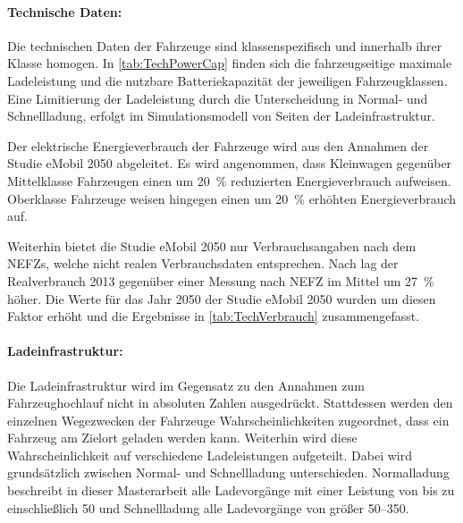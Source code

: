 

\paragraph{Technische Daten:}

Die technischen Daten der Fahrzeuge sind klassenspezifisch und innerhalb ihrer Klasse homogen.
In \autoref{tab:TechPowerCap} finden sich die fahrzeugseitige maximale Ladeleistung und die nutzbare Batteriekapazität der jeweiligen Fahrzeugklassen.
Eine Limitierung der Ladeleistung durch die Unterscheidung in Normal- und Schnellladung, erfolgt im Simulationsmodell von Seiten der Ladeinfrastruktur.



Der elektrische Energieverbrauch der Fahrzeuge wird aus den Annahmen der Studie \glqq eMobil \num{2050}\grqq{} \cite{Hacker2014} abgeleitet.
Es wird angenommen, dass Kleinwagen gegenüber Mittelklasse Fahrzeugen einen um \SI{20}{\percent} reduzierten Energieverbrauch aufweisen.
Oberklasse Fahrzeuge weisen hingegen einen um \SI{20}{\percent} erhöhten Energieverbrauch auf.\medskip

Weiterhin bietet die Studie \glqq eMobil \num{2050}\grqq{} nur Verbrauchsangaben nach dem \glspl{NEFZ}, welche nicht realen Verbrauchsdaten entsprechen.
Nach \cite{Heinfellner2015} lag der Realverbrauch \num{2013} gegenüber einer Messung nach \gls{NEFZ} im Mittel um \SI{27}{\percent} höher.
Die Werte für das Jahr \num{2050} der Studie \glqq eMobil \num{2050}\grqq{} wurden um diesen Faktor erhöht und die Ergebnisse in \autoref{tab:TechVerbrauch} zusammengefasst.



\paragraph{Ladeinfrastruktur:}

Die Ladeinfrastruktur wird im Gegensatz zu den Annahmen zum Fahrzeughochlauf nicht in absoluten Zahlen ausgedrückt.
Stattdessen werden den einzelnen Wegezwecken der Fahrzeuge Wahrscheinlichkeiten zugeordnet, dass ein Fahrzeug am Zielort geladen werden kann.
Weiterhin wird diese Wahrscheinlichkeit auf verschiedene Ladeleistungen aufgeteilt.
Dabei wird grundsätzlich zwischen Normal- und Schnellladung unterschieden.
Normalladung beschreibt in dieser Masterarbeit alle Ladevorgänge mit einer Leistung von bis zu einschließlich \SI{50}{\kw} und Schnellladung alle Ladevorgänge von größer \SIrange[range-phrase=~bis~einschließlich~]{50}{350}{\kw}.

